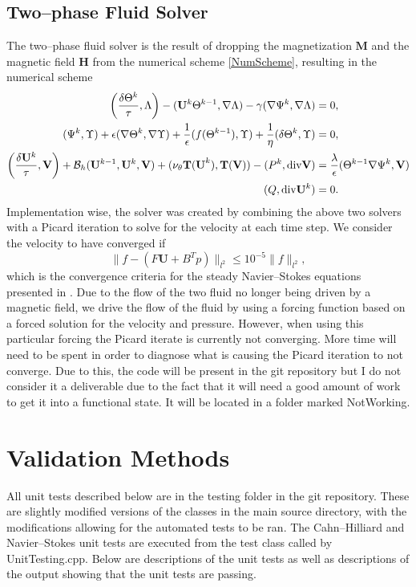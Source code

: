 \documentclass[11pt,fullpage]{article}
\newcommand{\norm}[1]{\|#1\|}
\newcommand{\eps}{\epsilon}
\newcommand{\grad}{\nabla}
\newcommand{\diver}{\textup{div} }
\theoremstyle{lemma}
\theoremstyle{definition}
\theoremstyle{lemma}
\begin{document}
\subsection{Two--phase Fluid Solver}
The two--phase fluid solver is the result of dropping the magnetization $\mathbf{M}$ and the magnetic field $\mathbf{H}$ from the numerical scheme \ref{NumScheme}, resulting in the numerical scheme
\begin{align*}
\bigg(\frac{\delta\Theta^k}{\tau}, \Lambda\bigg) - (\mathbf{U}^k\Theta^{k-1}, \grad\Lambda) - \gamma(\grad \Psi^k, \grad \Lambda)&=0,\\
(\Psi^k, \Upsilon) + \eps(\grad \Theta^k, \grad \Upsilon) + \frac{1}{\eps}(f(\Theta^{k-1}), \Upsilon) + \frac{1}{\eta}(\delta\Theta^k, \Upsilon) &= 0,\\
\bigg(\frac{\delta\mathbf{U}^k}{\tau}, \mathbf{V}\bigg) + \mathcal{B}_h(\mathbf{U}^{k-1}, \mathbf{U}^k, \mathbf{V}) + (\nu_\theta\mathbf{T(U}^k), \mathbf{T(V)}) - (P^k, \diver \mathbf{V}) &= \frac{\lambda}{\eps}(\Theta^{k-1}\grad \Psi^k, \mathbf{V})\\
(Q, \diver\mathbf{U}^k) &= 0.
\end{align*}
Implementation wise, the solver was created by combining the above two solvers with a Picard iteration to solve for the velocity at each time step. We consider the velocity to have converged if 
$$
	\norm{f - (F\mathbf{U} + B^T p)}_{l^2} \leq 10^{-5}\norm{f}_{l^2},
$$
which is the convergence criteria for the steady Navier--Stokes equations presented in \cite{Precond}. Due to the flow of the two fluid no longer being driven by a magnetic field, we drive the flow of the fluid by using a forcing function based on a forced solution for the velocity and pressure. However, when using this particular forcing the Picard iterate is currently not converging. More time will need to be spent in order to diagnose what is causing the Picard iteration to not converge. Due to this, the code will be present in the git repository but I do not consider it a deliverable due to the fact that it will need a good amount of work to get it into a functional state. It will be located in a folder marked NotWorking.


\section{Validation Methods}
All unit tests described below are in the testing folder in the git repository. These are slightly modified versions of the classes in the main source directory, with the modifications allowing for the automated tests to be ran. The Cahn--Hilliard and Navier--Stokes unit tests are executed from the test class called by UnitTesting.cpp. Below are descriptions of the unit tests as well as descriptions of the output showing that the unit tests are passing.
\end{document}
